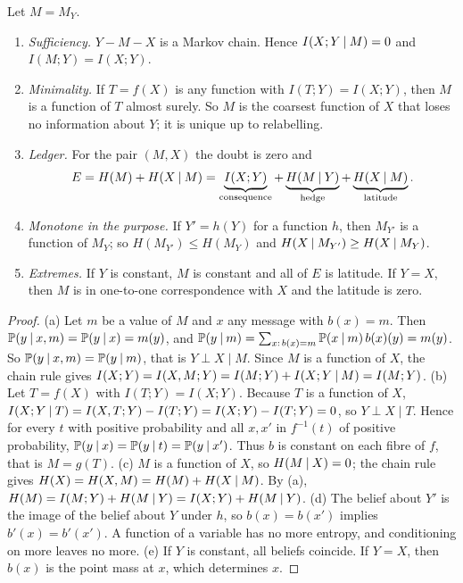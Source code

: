 \begin{theorem}\label{thm:derived}
Let $M=M_Y$.
\begin{enumerate}[label=\textup{(\alph*)}]
\item \emph{Sufficiency.} $Y-M-X$ is a Markov chain. Hence $I(X;Y\mathbin{\vert} M)=0$ and $I(M;Y)=I(X;Y)$.
\item \emph{Minimality.} If $T=f(X)$ is any function with $I(T;Y)=I(X;Y)$, then $M$ is a function of $T$ almost surely. So $M$ is the coarsest function of $X$ that loses no information about $Y$; it is unique up to relabelling.
\item \emph{Ledger.} For the pair $(M,X)$ the doubt is zero and
\begin{equation}
E=H(M)+H(X\mathbin{\vert} M)=\underbrace{I(X;Y)}_{\text{consequence}}+\underbrace{H(M\mathbin{\vert} Y)}_{\text{hedge}}+\underbrace{H(X\mathbin{\vert} M)}_{\text{latitude}} .
\end{equation}
\item \emph{Monotone in the purpose.} If $Y'=h(Y)$ for a function $h$, then $M_{Y'}$ is a function of $M_Y$; so $H(M_{Y'})\le H(M_Y)$ and $H(X\mathbin{\vert} M_{Y'})\ge H(X\mathbin{\vert} M_Y)$.
\item \emph{Extremes.} If $Y$ is constant, $M$ is constant and all of $E$ is latitude. If $Y=X$, then $M$ is in one-to-one correspondence with $X$ and the latitude is zero.
\end{enumerate}
\end{theorem}
\begin{proof}
(a) Let $m$ be a value of $M$ and $x$ any message with $b(x)=m$. Then $\mathbb{P}(y\mathbin{\vert} x,m)=\mathbb{P}(y\mathbin{\vert} x)=m(y)$, and $\mathbb{P}(y\mathbin{\vert} m)=\sum_{x:\,b(x)=m}\mathbb{P}(x\mathbin{\vert} m)\,b(x)(y)=m(y)$. So $\mathbb{P}(y\mathbin{\vert} x,m)=\mathbb{P}(y\mathbin{\vert} m)$, that is $Y\perp X\mid M$. Since $M$ is a function of $X$, the chain rule gives $I(X;Y)=I(X,M;Y)=I(M;Y)+I(X;Y\mathbin{\vert} M)=I(M;Y)$.
(b) Let $T=f(X)$ with $I(T;Y)=I(X;Y)$. Because $T$ is a function of $X$, $I(X;Y\mathbin{\vert} T)=I(X,T;Y)-I(T;Y)=I(X;Y)-I(T;Y)=0$, so $Y\perp X\mid T$. Hence for every $t$ with positive probability and all $x,x'$ in $f^{-1}(t)$ of positive probability, $\mathbb{P}(y\mathbin{\vert} x)=\mathbb{P}(y\mathbin{\vert} t)=\mathbb{P}(y\mathbin{\vert} x')$. Thus $b$ is constant on each fibre of $f$, that is $M=g(T)$.
(c) $M$ is a function of $X$, so $H(M\mathbin{\vert} X)=0$; the chain rule gives $H(X)=H(X,M)=H(M)+H(X\mathbin{\vert} M)$. By (a), $H(M)=I(M;Y)+H(M\mathbin{\vert} Y)=I(X;Y)+H(M\mathbin{\vert} Y)$.
(d) The belief about $Y'$ is the image of the belief about $Y$ under $h$, so $b(x)=b(x')$ implies $b'(x)=b'(x')$. A function of a variable has no more entropy, and conditioning on more leaves no more.
(e) If $Y$ is constant, all beliefs coincide. If $Y=X$, then $b(x)$ is the point mass at $x$, which determines $x$.
\end{proof}
